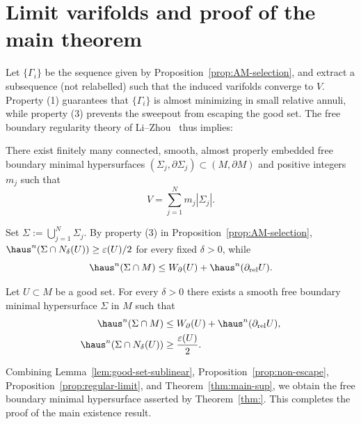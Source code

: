 \section{Limit varifolds and proof of the main theorem}\label{sec:main-proof}
Let $\{\Gamma_i\}$ be the sequence given by Proposition~\ref{prop:AM-selection}, and extract a subsequence (not relabelled) such that the induced varifolds converge to $V$.  Property (1) guarantees that $\{\Gamma_i\}$ is almost minimizing in small relative annuli, while property (3) prevents the sweepout from escaping the good set.  The free boundary regularity theory of Li--Zhou~\cite{LZ17} thus implies:

\begin{proposition}\label{prop:regular-limit}
There exist finitely many connected, smooth, almost properly embedded free boundary minimal hypersurfaces $(\Sigma_j,\partial\Sigma_j)\subset (M,\partial M)$ and positive integers $m_j$ such that
\[
V=\sum_{j=1}^N m_j|\Sigma_j|.
\]
\end{proposition}

Set $\Sigma:=\bigcup_{j=1}^N \Sigma_j$.  By property (3) in Proposition~\ref{prop:AM-selection}, $\haus^n(\Sigma\cap N_\delta(U))\ge \varepsilon(U)/2$ for every fixed $\delta>0$, while
\[
\haus^n(\Sigma\cap M)\le W_\partial(U)+\haus^n(\partial_{\mathrm{rel}}U).
\]

\begin{theorem}\label{thm:main-sup}
Let $U\subset M$ be a good set.  For every $\delta>0$ there exists a smooth free boundary minimal hypersurface $\Sigma$ in $M$ such that
\begin{align*}
    \haus^n(\Sigma\cap M) &\le W_\partial(U)+\haus^n(\partial_{\mathrm{rel}}U),\\
    \haus^n(\Sigma\cap N_\delta(U)) &\ge \frac{\varepsilon(U)}{2}.
\end{align*}
\end{theorem}

Combining Lemma~\ref{lem:good-set-sublinear}, Proposition~\ref{prop:non-escape}, Proposition~\ref{prop:regular-limit}, and Theorem~\ref{thm:main-sup}, we obtain the free boundary minimal hypersurface asserted by Theorem~\ref{thm:}.  This completes the proof of the main existence result.
